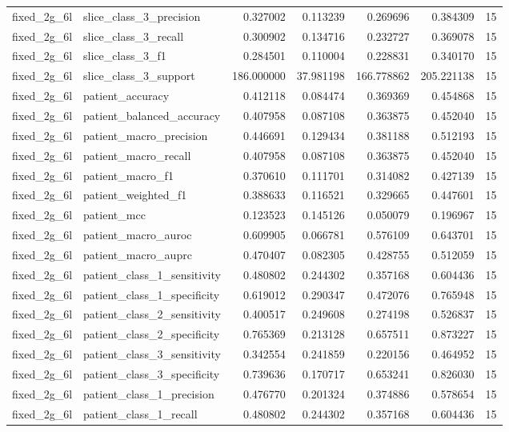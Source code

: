 \begin{tabular}{llrrrrr}
fixed_2g_6l & slice_class_3_precision & 0.327002 & 0.113239 & 0.269696 & 0.384309 & 15 \\
fixed_2g_6l & slice_class_3_recall & 0.300902 & 0.134716 & 0.232727 & 0.369078 & 15 \\
fixed_2g_6l & slice_class_3_f1 & 0.284501 & 0.110004 & 0.228831 & 0.340170 & 15 \\
fixed_2g_6l & slice_class_3_support & 186.000000 & 37.981198 & 166.778862 & 205.221138 & 15 \\
fixed_2g_6l & patient_accuracy & 0.412118 & 0.084474 & 0.369369 & 0.454868 & 15 \\
fixed_2g_6l & patient_balanced_accuracy & 0.407958 & 0.087108 & 0.363875 & 0.452040 & 15 \\
fixed_2g_6l & patient_macro_precision & 0.446691 & 0.129434 & 0.381188 & 0.512193 & 15 \\
fixed_2g_6l & patient_macro_recall & 0.407958 & 0.087108 & 0.363875 & 0.452040 & 15 \\
fixed_2g_6l & patient_macro_f1 & 0.370610 & 0.111701 & 0.314082 & 0.427139 & 15 \\
fixed_2g_6l & patient_weighted_f1 & 0.388633 & 0.116521 & 0.329665 & 0.447601 & 15 \\
fixed_2g_6l & patient_mcc & 0.123523 & 0.145126 & 0.050079 & 0.196967 & 15 \\
fixed_2g_6l & patient_macro_auroc & 0.609905 & 0.066781 & 0.576109 & 0.643701 & 15 \\
fixed_2g_6l & patient_macro_auprc & 0.470407 & 0.082305 & 0.428755 & 0.512059 & 15 \\
fixed_2g_6l & patient_class_1_sensitivity & 0.480802 & 0.244302 & 0.357168 & 0.604436 & 15 \\
fixed_2g_6l & patient_class_1_specificity & 0.619012 & 0.290347 & 0.472076 & 0.765948 & 15 \\
fixed_2g_6l & patient_class_2_sensitivity & 0.400517 & 0.249608 & 0.274198 & 0.526837 & 15 \\
fixed_2g_6l & patient_class_2_specificity & 0.765369 & 0.213128 & 0.657511 & 0.873227 & 15 \\
fixed_2g_6l & patient_class_3_sensitivity & 0.342554 & 0.241859 & 0.220156 & 0.464952 & 15 \\
fixed_2g_6l & patient_class_3_specificity & 0.739636 & 0.170717 & 0.653241 & 0.826030 & 15 \\
fixed_2g_6l & patient_class_1_precision & 0.476770 & 0.201324 & 0.374886 & 0.578654 & 15 \\
fixed_2g_6l & patient_class_1_recall & 0.480802 & 0.244302 & 0.357168 & 0.604436 & 15 \\

\end{tabular}

